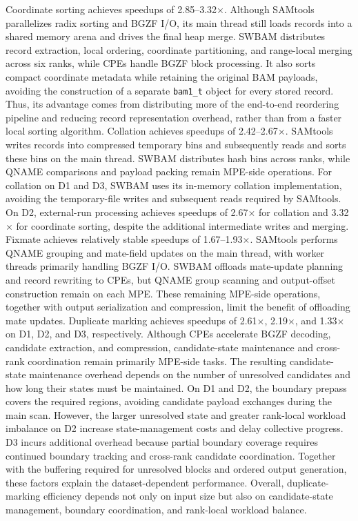 \documentclass[lettersize,journal]{IEEEtran}
\begin{document}
Coordinate sorting achieves speedups of 2.85--3.32$\times$. 
Although SAMtools parallelizes radix sorting and BGZF I/O, its main thread still loads records into a shared memory arena and drives the final heap merge. 
SWBAM distributes record extraction, local ordering, coordinate partitioning, and range-local merging across six ranks, while CPEs handle BGZF block processing. 
It also sorts compact coordinate metadata while retaining the original BAM payloads, avoiding the construction of a separate \texttt{bam1\_t} object for every stored record. Thus, its advantage comes from distributing more of the end-to-end reordering pipeline and reducing record representation overhead, rather than from a faster local sorting algorithm.
Collation achieves speedups of 2.42--2.67$\times$. 
SAMtools writes records into compressed temporary bins and subsequently reads and sorts these bins on the main thread. 
SWBAM distributes hash bins across ranks, while QNAME comparisons and payload packing remain MPE-side operations. 
For collation on D1 and D3, SWBAM uses its in-memory collation implementation, avoiding the temporary-file writes and subsequent reads required by SAMtools. 
On D2, external-run processing achieves speedups of 2.67$\times$ for collation and 3.32$\times$ for coordinate sorting, despite the additional intermediate writes and merging.
Fixmate achieves relatively stable speedups of 1.67--1.93$\times$. 
SAMtools performs QNAME grouping and mate-field updates on the main thread, with worker threads primarily handling BGZF I/O. 
SWBAM offloads mate-update planning and record rewriting to CPEs, but QNAME group scanning and output-offset construction remain on each MPE. 
These remaining MPE-side operations, together with output serialization and compression, limit the benefit of offloading mate updates.
Duplicate marking achieves speedups of 2.61$\times$, 2.19$\times$, and 1.33$\times$ on D1, D2, and D3, respectively. 
Although CPEs accelerate BGZF decoding, candidate extraction, and compression, candidate-state maintenance and cross-rank coordination remain primarily MPE-side tasks.
The resulting candidate-state maintenance overhead depends on the number of unresolved candidates and how long their states must be maintained. 
On D1 and D2, the boundary prepass covers the required regions, avoiding candidate payload exchanges during the main scan. 
However, the larger unresolved state and greater rank-local workload imbalance on D2 increase state-management costs and delay collective progress. 
D3 incurs additional overhead because partial boundary coverage requires continued boundary tracking and cross-rank candidate coordination. 
Together with the buffering required for unresolved blocks and ordered output generation, these factors explain the dataset-dependent performance. 
Overall, duplicate-marking efficiency depends not only on input size but also on candidate-state management, boundary coordination, and rank-local workload balance.
\end{document}
